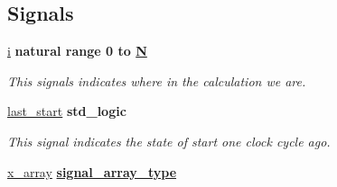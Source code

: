 \subsection*{Signals}
 \begin{DoxyCompactItemize}
\item 
\hypertarget{classdigitalfilter_1_1FIR__filter_a8aec3be51b0069e78a0e282e59e98862}{\hyperlink{classdigitalfilter_1_1FIR__filter_a8aec3be51b0069e78a0e282e59e98862}{i} {\bfseries \textcolor{comment}{natural}\textcolor{vhdlchar}{ }\textcolor{vhdlkeyword}{range}\textcolor{vhdlchar}{ } \textcolor{vhdldigit}{0} \textcolor{vhdlchar}{ }\textcolor{vhdlchar}{ }\textcolor{vhdlchar}{ }\textcolor{vhdlkeyword}{to}\textcolor{vhdlchar}{ }\textcolor{vhdlchar}{ }\textcolor{vhdlchar}{ }{\bfseries \hyperlink{classdigitalfilter_a61de7093f96d3bc9f246d1d7744f9dc6}{N}} \textcolor{vhdlchar}{ }} }\label{classdigitalfilter_1_1FIR__filter_a8aec3be51b0069e78a0e282e59e98862}

\begin{DoxyCompactList}\small\item\em This signals indicates where in the calculation we are. \end{DoxyCompactList}\item 
\hypertarget{classdigitalfilter_1_1FIR__filter_a8e778e9b195179093112d51310e651b4}{\hyperlink{classdigitalfilter_1_1FIR__filter_a8e778e9b195179093112d51310e651b4}{last\-\_\-start} {\bfseries \textcolor{comment}{std\-\_\-logic}\textcolor{vhdlchar}{ }} }\label{classdigitalfilter_1_1FIR__filter_a8e778e9b195179093112d51310e651b4}

\begin{DoxyCompactList}\small\item\em This signal indicates the state of start one clock cycle ago. \end{DoxyCompactList}\item 
\hypertarget{classdigitalfilter_1_1FIR__filter_a9c56fec42addf228b03fb668215d62f2}{\hyperlink{classdigitalfilter_1_1FIR__filter_a9c56fec42addf228b03fb668215d62f2}{x\-\_\-array} {\bfseries {\bfseries \hyperlink{classdigitalfilter_1_1FIR__filter_a5a73ea446badc89417742fc0bad2eaf9}{signal\-\_\-array\-\_\-type}} \textcolor{vhdlchar}{ }} }\label{classdigitalfilter_1_1FIR__filter_a9c56fec42addf228b03fb668215d62f2}


\end{DoxyCompactItemize}
